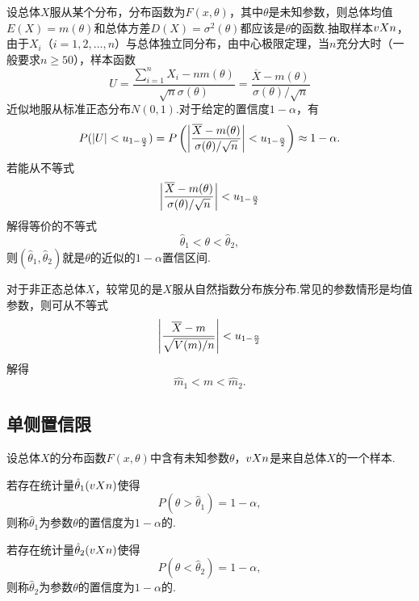 设总体\(X\)服从某个分布，分布函数为\(F(x,\theta)\)，其中\(\theta\)是未知参数，则总体均值\(E(X)=m(\theta)\)和总体方差\(D(X)=\sigma^2(\theta)\)都应该是\(\theta\)的函数.抽取样本\(v{X}{n}\)，由于\(X_i\)（\(i=1,2,\dotsc,n\)）与总体独立同分布，由中心极限定理，当\(n\)充分大时（一般要求\(n \geqslant 50\)），样本函数\[
U = \frac{\sum\limits_{i=1}^n{X_i} - n m(\theta)}{\sqrt{n} \sigma(\theta)}
= \frac{\overline{X} - m(\theta)}{\sigma(\theta) / \sqrt{n}}
\]近似地服从标准正态分布\(N(0,1)\).对于给定的置信度\(1-\alpha\)，有\[
P(\abs{U}<u_{1-\frac{\alpha}{2}})
= P\left(\abs{\frac{\overline{X} - m(\theta)}{\sigma(\theta) / \sqrt{n}}}<u_{1-\frac{\alpha}{2}}\right)
\approx 1-\alpha.
\]若能从不等式\[
\abs{\frac{\overline{X} - m(\theta)}{\sigma(\theta) / \sqrt{n}}}<u_{1-\frac{\alpha}{2}}
\]解得等价的不等式\[
\hat{\theta}_1 < \theta < \hat{\theta}_2,
\]则\((\hat{\theta}_1, \hat{\theta}_2)\)就是\(\theta\)的近似的\(1-\alpha\)置信区间.

对于非正态总体\(X\)，较常见的是\(X\)服从自然指数分布族分布.常见的参数情形是均值参数，则可从不等式\[
\abs{\frac{\overline{X} - m}{\sqrt{V(m) / n}}}<u_{1-\frac{\alpha}{2}}
\]解得\[
\hat{m}_1 < m < \hat{m}_2.
\]

\subsection{单侧置信限}
\begin{definition}
设总体\(X\)的分布函数\(F(x,\theta)\)中含有未知参数\(\theta\)，\(v{X}{n}\)是来自总体\(X\)的一个样本.

若存在统计量\(\hat{\theta}_1(v{X}{n})\)使得\[
P(\theta>\hat{\theta}_1)=1-\alpha,
\]则称\(\hat{\theta}_1\)为参数\(\theta\)的置信度为\(1-\alpha\)的.

若存在统计量\(\hat{\theta}_2(v{X}{n})\)使得\[
P(\theta<\hat{\theta}_2)=1-\alpha,
\]则称\(\hat{\theta}_2\)为参数\(\theta\)的置信度为\(1-\alpha\)的.
\end{definition}
